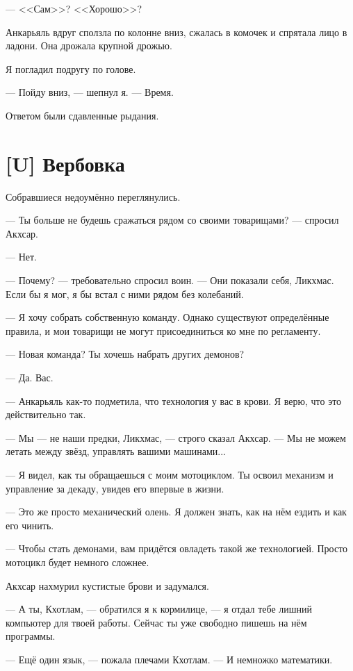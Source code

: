 ---  <<Сам>>?
<<Хорошо>>?

Анкарьяль вдруг сползла по колонне вниз, сжалась в комочек и спрятала лицо в ладони.
Она дрожала крупной дрожью.

Я погладил подругу по голове.

--- Пойду вниз, --- шепнул я.
--- Время.

Ответом были сдавленные рыдания.

\section{[U] Вербовка}

\textspace

Собравшиеся недоумённо переглянулись.

--- Ты больше не будешь сражаться рядом со своими товарищами? --- спросил Акхсар.

--- Нет.

--- Почему? --- требовательно спросил воин.
--- Они показали себя, Ликхмас.
Если бы я мог, я бы встал с ними рядом без колебаний.

--- Я хочу собрать собственную команду.
Однако существуют определённые правила, и мои товарищи не могут присоединиться ко мне по регламенту.

--- Новая команда?
Ты хочешь набрать других демонов?

--- Да.
Вас.

\textspace

--- Анкарьяль как-то подметила, что технология у вас в крови.
Я верю, что это действительно так.

--- Мы --- не наши предки, Ликхмас, --- строго сказал Акхсар.
--- Мы не можем летать между звёзд, управлять вашими машинами...

--- Я видел, как ты обращаешься с моим мотоциклом.
Ты освоил механизм и управление за декаду, увидев его впервые в жизни.

--- Это же просто механический олень.
Я должен знать, как на нём ездить и как его чинить.

--- Чтобы стать демонами, вам придётся овладеть такой же технологией.
Просто мотоцикл будет немного сложнее.

Акхсар нахмурил кустистые брови и задумался.

--- А ты, Кхотлам, --- обратился я к кормилице, --- я отдал тебе лишний компьютер для твоей работы.
Сейчас ты уже свободно пишешь на нём программы.

--- Ещё один язык, --- пожала плечами Кхотлам.
--- И немножко математики.

